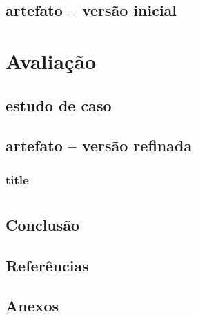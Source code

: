 \documentclass[12pt, a4paper]{book} %
\begin{document}
        \chapter[Diretrizes projetuais]{artefato – versão inicial}

    \part[Avaliação]{Avaliação}

        \chapter[Comparativo com existente]{estudo de caso}

        \chapter[Grupos focais e \textit{feedback}]{}

        \chapter[Diretrizes projetuais]{artefato – versão refinada}

            \section[Comunicação do artefato aos \textit{stakeholders}]{title}


    \part*{}

        \chapter*{Conclusão}

        \chapter*{Referências}


        \chapter*{Anexos}
\end{document}

